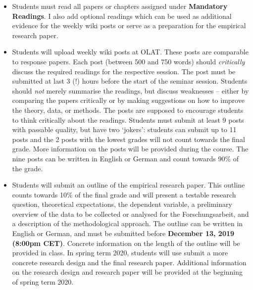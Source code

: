 \documentclass[abstract=on,parskip=full,headings=standardclasses,fontsize=11pt,paper=a4]{scrartcl}
\begin{document}
\begin{itemize}
\item Students  must  read all papers or chapters assigned under \textbf{Mandatory Readings}.  I also add optional readings which can be used as additional evidence for the weekly wiki posts or serve as a preparation for the empirical research paper.

\item Students will upload  weekly wiki posts  at OLAT. These posts are comparable to response papers. Each post (between 500 and 750 words) should \textit{critically} discuss the required readings for the respective session. The post must be submitted  at last 3 (!) hours before the start of the seminar session. Students should \textit{not}  merely summarise the readings, but  discuss weaknesses -- either by comparing the papers critically  or by making suggestions on how to improve the theory, data, or methods.  The posts are supposed to encourage students to think critically about the readings.  Students must submit at least 9 posts with passable quality, but have two `jokers': students can submit up to 11 posts and the 2 posts with the lowest grades will not count towards the final grade. More information on the posts will be provided during the course. The nine posts can be written in English or German and  count towards 90\% of the grade. 

\item Students will submit an outline of the empirical research paper. This outline counts towards 10\% of the final grade and will present a testable research question,  theoretical expectations,  the dependent variable, a preliminary overview of the data to be collected or analysed for the Forschungsarbeit, and a description of the methodological approach. The outline can be written in English or German, and must be submitted before \textbf{December 13, 2019 (8:00pm CET)}. Concrete information on the length of the outline will be provided in class.  In spring term 2020, students will use submit a  more concrete research design and the final research paper. Additional information on the research design and research paper will be provided at the beginning of spring term 2020.




\end{itemize}
\end{document}

